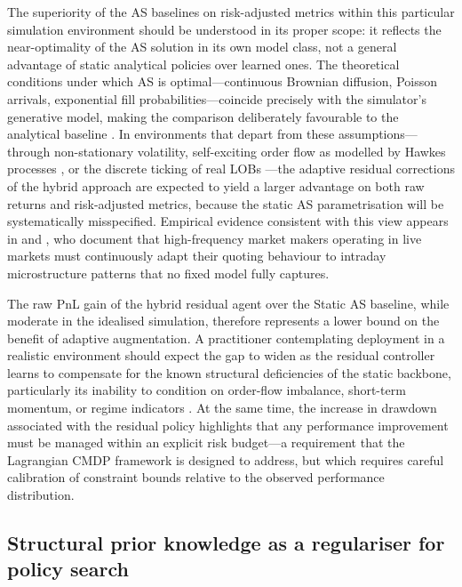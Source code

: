 \documentclass[11pt]{article}
\begin{document}
The superiority of the AS baselines on risk-adjusted metrics within this
particular simulation environment should be understood in its proper
scope: it reflects the near-optimality of the AS solution in its own
model class, not a general advantage of static analytical policies over
learned ones.
The theoretical conditions under which AS is optimal---continuous
Brownian diffusion, Poisson arrivals, exponential fill
probabilities---coincide precisely with the simulator's generative
model, making the comparison deliberately favourable to the analytical
baseline \parencite{avellaneda2008hftlob}.
In environments that depart from these assumptions---through non-stationary
volatility, self-exciting order flow as modelled by Hawkes processes
\parencite{gasperov2022hawkesmm}, or the discrete ticking of real LOBs
\parencite{cont2013markovlob}---the adaptive residual corrections of the
hybrid approach are expected to yield a larger advantage on both raw
returns and risk-adjusted metrics, because the static AS parametrisation
will be systematically misspecified.
Empirical evidence consistent with this view appears in
\textcite{hendershott2011does} and \textcite{menkveld2013high}, who
document that high-frequency market makers operating in live markets
must continuously adapt their quoting behaviour to intraday microstructure
patterns that no fixed model fully captures.

The raw PnL gain of the hybrid residual agent over the Static AS baseline,
while moderate in the idealised simulation, therefore represents a lower
bound on the benefit of adaptive augmentation.
A practitioner contemplating deployment in a realistic environment should
expect the gap to widen as the residual controller learns to compensate
for the known structural deficiencies of the static backbone, particularly
its inability to condition on order-flow imbalance, short-term momentum,
or regime indicators \parencite{lehalle2019incorporating,cont2010stochastic}.
At the same time, the increase in drawdown associated with the residual
policy highlights that any performance improvement must be managed
within an explicit risk budget---a requirement that the Lagrangian CMDP
framework is designed to address, but which requires careful calibration
of constraint bounds relative to the observed performance distribution.

\subsection{Structural prior knowledge as a regulariser for policy search}
\end{document}
